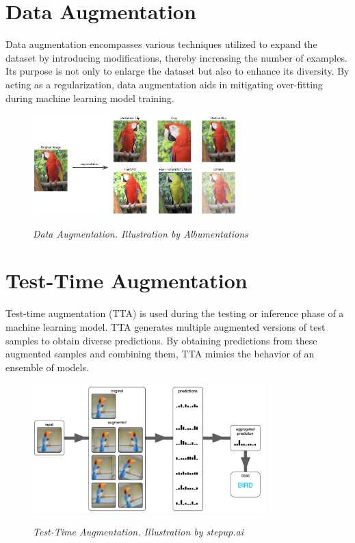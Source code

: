 \section{Data Augmentation}

Data augmentation encompasses various techniques utilized to expand the dataset
by introducing modifications, thereby increasing the number of examples. Its
purpose is not only to enlarge the dataset but also to enhance its diversity.
By acting as a regularization, data augmentation aids in mitigating
over-fitting during machine learning model training.

\begin{figure}[H]
  \centering
  \includegraphics[width=0.7\textwidth]{imatges/preliminaries/augmentation.jpg}
  \caption[Data Augmentation]{\textit{Data Augmentation. Illustration by Albumentations}}
  {\label{fig:augmentation}}
\end{figure}


\section{Test-Time Augmentation}

Test-time augmentation (TTA) is used during the testing or inference phase of a
machine learning model. TTA generates multiple augmented versions of test
samples to obtain diverse predictions. By obtaining predictions from these
augmented samples and combining them, TTA mimics the behavior of an ensemble of
models.

\begin{figure}[H]
  \centering
  \includegraphics[width=0.8\textwidth]{imatges/preliminaries/tta.png}
  \caption[Test-Time Augmentation]{\textit{Test-Time Augmentation. Illustration by stepup.ai}}
  {\label{fig:tta}}
\end{figure}

